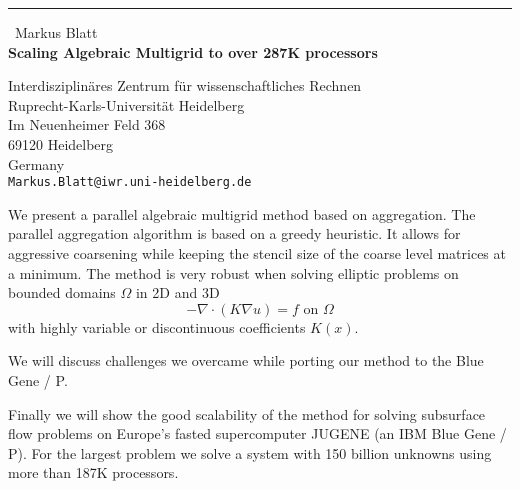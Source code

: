 \documentclass{report}
\begin{document}
\begin{center}
\rule{6in}{1pt} \
{\large Markus Blatt \\
{\bf Scaling Algebraic Multigrid to over 287K processors}}

Interdisziplin\"{a}res Zentrum f\"{u}r wissenschaftliches Rechnen \\ Ruprecht-Karls-Universit\"{a}t Heidelberg \\ Im Neuenheimer Feld 368 \\ 69120 Heidelberg \\ Germany
\\
{\tt Markus.Blatt@iwr.uni-heidelberg.de}\end{center}

We present a parallel algebraic multigrid method based on aggregation.
The parallel aggregation algorithm is based on a greedy heuristic. It
allows for aggressive coarsening while keeping the stencil size of the
coarse level matrices at a minimum. The method is very robust when
solving elliptic problems on bounded domains $\Omega$ in 2D and 3D
$$
-\nabla \cdot (K \nabla u) = f \text{ on } \Omega
$$
with highly variable or discontinuous coefficients $K(x)$.

We will discuss challenges we overcame while porting our method to the Blue Gene / P.

Finally we will show the good scalability of the method for solving
subsurface flow problems on Europe's fasted supercomputer JUGENE (an IBM
Blue Gene / P). For the largest problem we solve a system with 150
billion unknowns using more than 187K processors.
\end{document}

